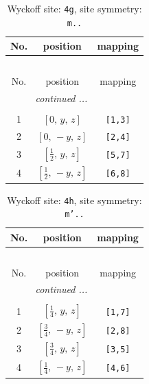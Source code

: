 \documentclass[fleqn,8pt]{jsarticle}
\begin{document}
\renewcommand{\arraystretch}{1.2}
\begin{longtable}{ccc}
\caption{Wyckoff site: {\tt 4g}, site symmetry: {\tt m..}}
 \\
 \hline \hline
No. & position & mapping \\ \hline \endfirsthead

\multicolumn{2}{l}{\tablename\ \thetable{}} \\
 \hline \hline
No. & position & mapping \\ \hline \endhead

 \hline \hline
\multicolumn{2}{r}{\footnotesize\it continued ...} \\ \endfoot

 \hline \hline
\multicolumn{2}{r}{} \\ \endlastfoot

1 & $\left[ 0,\, y,\, z \right]$ & {\tt [1,3]} \\ \hline
2 & $\left[ 0,\, - y,\, z \right]$ & {\tt [2,4]} \\ \hline
3 & $\left[ \frac{1}{2},\, y,\, z \right]$ & {\tt [5,7]} \\ \hline
4 & $\left[ \frac{1}{2},\, - y,\, z \right]$ & {\tt [6,8]} \\
\end{longtable}
\renewcommand{\arraystretch}{1.2}
\begin{longtable}{ccc}
\caption{Wyckoff site: {\tt 4h}, site symmetry: {\tt m'..}}
 \\
 \hline \hline
No. & position & mapping \\ \hline \endfirsthead

\multicolumn{2}{l}{\tablename\ \thetable{}} \\
 \hline \hline
No. & position & mapping \\ \hline \endhead

 \hline \hline
\multicolumn{2}{r}{\footnotesize\it continued ...} \\ \endfoot

 \hline \hline
\multicolumn{2}{r}{} \\ \endlastfoot

1 & $\left[ \frac{1}{4},\, y,\, z \right]$ & {\tt [1,7]} \\ \hline
2 & $\left[ \frac{3}{4},\, - y,\, z \right]$ & {\tt [2,8]} \\ \hline
3 & $\left[ \frac{3}{4},\, y,\, z \right]$ & {\tt [3,5]} \\ \hline
4 & $\left[ \frac{1}{4},\, - y,\, z \right]$ & {\tt [4,6]} \\
\end{longtable}
\end{document}
